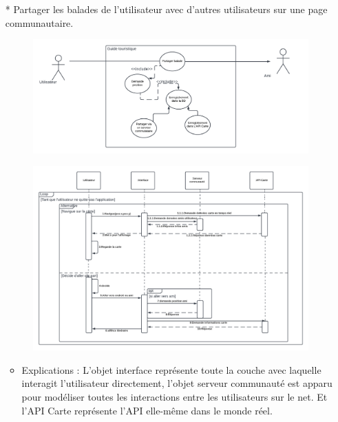 \documentclass[12pt]{article}
\begin{document}
\begin{itemize}
	\item[* ]  Partager les balades de l’utilisateur avec d’autres utilisateurs sur une page communautaire.
		\begin{figure}[!hbtp]
			\centering
			\includegraphics[scale=0.65]{Capture1_s.PNG}
		\end{figure}
		\begin{figure}[!hbtp]
		\centering
		\includegraphics[scale=0.5]{Capture1.PNG}
	\end{figure}
\begin{itemize}
	\item Explications : 
	L'objet interface représente toute la couche avec laquelle interagit l'utilisateur directement, l'objet serveur communauté est apparu pour modéliser toutes les interactions entre les utilisateurs sur le net. Et l'API Carte représente l'API elle-même dans le monde réel.
	

\end{itemize}
\end{itemize}
\end{document}
